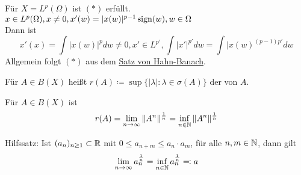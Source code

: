 \begin{bemerkung} \label{bem:13.7}
	Für $X = L^{p}(\Omega)$ ist \hyperref[eq:13.6.5-DualAbbildungAuf0]{$(*)$} erfüllt. $x \in L^{p}(\Omega), x \neq 0, x'(w) = |x(w)|^{p-1} \operatorname{sign}(w), w \in \Omega$ \\
	Dann ist 
	\[ x'(x) = \int | x(w) |^{p} dw \neq 0, x' \in L^{p'}, \int |x'|^{p'} dw = \int |x(w)^{(p-1)p'} dw \]
	Allgemein folgt \hyperref[eq:13.6.5-DualAbbildungAuf0]{$(*)$} aus dem \hyperref[satz:20.2-HahnBanach]{Satz von Hahn-Banach}. 
\end{bemerkung}


\begin{definition} \label{def:13.8-Spektralradius}
	Für $A \in B(X)$ hei{\ss}t $r(A) \coloneqq \sup \{ | \lambda |: \lambda \in \sigma(A) \}$ der  von $A$.
\end{definition}


\begin{satz} \label{satz:13.9}
	Für $A \in B(X)$ ist
		\[ r(A) = \lim_{n \rightarrow \infty} \| A^{n} \|^{\frac{1}{n}} = \inf_{n \in \mathbb{N}} \| A^{n} \|^{\frac{1}{n}} \]
\end{satz}

\begin{satz*}
	Hilfssatz: Ist $(a_{n})_{n \geq 1} \subset \mathbb{R}$ mit $0 \leq a_{n + m} \leq a_{n} \cdot a_{m}$, für alle $n,m \in \mathbb{N}$, dann gilt 
	\[ \lim_{n \rightarrow \infty} a_{n}^{\frac{1}{n}} = \inf_{n \in \mathbb{N}} a_{n}^{\frac{1}{n}} \eqqcolon a \]	
\end{satz*}


